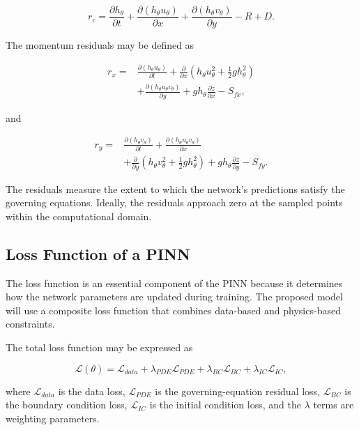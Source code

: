 \[
r_c=
\frac{\partial h_{\theta}}{\partial t}
+
\frac{\partial (h_{\theta}u_{\theta})}{\partial x}
+
\frac{\partial (h_{\theta}v_{\theta})}{\partial y}
-R+D.
\]

The momentum residuals may be defined as

\[
\begin{aligned}
r_x={}&
\frac{\partial (h_{\theta}u_{\theta})}{\partial t}
+
\frac{\partial}{\partial x}
\left(h_{\theta}u_{\theta}^{2}
+\frac{1}{2}gh_{\theta}^{2}\right)\\
&+
\frac{\partial (h_{\theta}u_{\theta}v_{\theta})}{\partial y}
+
gh_{\theta}\frac{\partial z}{\partial x}
-S_{fx},
\end{aligned}
\]

and

\[
\begin{aligned}
r_y={}&
\frac{\partial (h_{\theta}v_{\theta})}{\partial t}
+
\frac{\partial (h_{\theta}u_{\theta}v_{\theta})}{\partial x}\\
&+
\frac{\partial}{\partial y}
\left(h_{\theta}v_{\theta}^{2}
+\frac{1}{2}gh_{\theta}^{2}\right)
+
gh_{\theta}\frac{\partial z}{\partial y}
-S_{fy}.
\end{aligned}
\]

The residuals measure the extent to which the network's predictions satisfy the governing equations. Ideally, the residuals approach zero at the sampled points within the computational domain.

\subsection{Loss Function of a PINN}


The loss function is an essential component of the PINN because it determines how the network parameters are updated during training. The proposed model will use a composite loss function that combines data-based and physics-based constraints.

The total loss function may be expressed as

\[
\mathcal{L}(\theta)
=
\mathcal{L}_{data}
+
\lambda_{PDE}\mathcal{L}_{PDE}
+
\lambda_{BC}\mathcal{L}_{BC}
+
\lambda_{IC}\mathcal{L}_{IC},
\]

where $\mathcal{L}_{data}$ is the data loss, $\mathcal{L}_{PDE}$ is the governing-equation residual loss, $\mathcal{L}_{BC}$ is the boundary condition loss, $\mathcal{L}_{IC}$ is the initial condition loss, and the $\lambda$ terms are weighting parameters.

